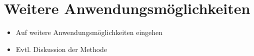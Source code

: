 %
%
%
%

\section{Weitere Anwendungsmöglichkeiten\label{neuronal:section:weiteres}}

\begin{itemize}
    \item Auf weitere Anwendungsmöglichkeiten eingehen
    \item Evtl. Diskussion der Methode
\end{itemize}